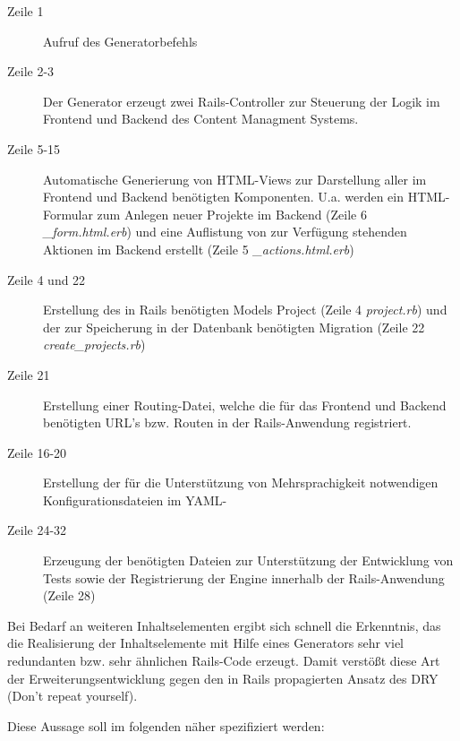 \begin{description}
\item[Zeile 1]
Aufruf des Generatorbefehls
\item[Zeile 2-3]
Der Generator erzeugt zwei Rails-Controller zur Steuerung der Logik im Frontend und Backend des Content Managment Systems.
\item[Zeile 5-15]
Automatische Generierung von HTML-Views zur Darstellung aller im Frontend und Backend benötigten Komponenten. U.a. werden ein HTML-Formular zum Anlegen neuer Projekte im Backend (Zeile 6 \emph{\_form.html.erb}) und eine Auflistung von zur Verfügung stehenden Aktionen im Backend erstellt (Zeile 5 \emph{\_actions.html.erb})
\item[Zeile 4 und 22]
Erstellung des in Rails benötigten Models Project (Zeile 4 \emph{project.rb}) und der zur Speicherung in der Datenbank benötigten Migration (Zeile 22 \emph{create\_projects.rb})
\item[Zeile 21]
Erstellung einer Routing-Datei, welche die für das Frontend und Backend benötigten URL's bzw. Routen in der Rails-Anwendung registriert.
\item[Zeile 16-20]
Erstellung der für die Unterstützung von Mehrsprachigkeit notwendigen Konfigurationsdateien im YAML-
\item[Zeile 24-32]
Erzeugung der benötigten Dateien zur Unterstützung der Entwicklung von Tests sowie der Registrierung der Engine innerhalb der Rails-Anwendung (Zeile 28)
\end{description}

Bei Bedarf an weiteren Inhaltselementen ergibt sich schnell die Erkenntnis, das die Realisierung der Inhaltselemente mit Hilfe eines Generators sehr viel redundanten bzw. sehr ähnlichen Rails-Code erzeugt. Damit verstößt diese Art der Erweiterungsentwicklung gegen den in Rails propagierten Ansatz des DRY (Don't repeat yourself).

Diese Aussage soll im folgenden näher spezifiziert werden:


